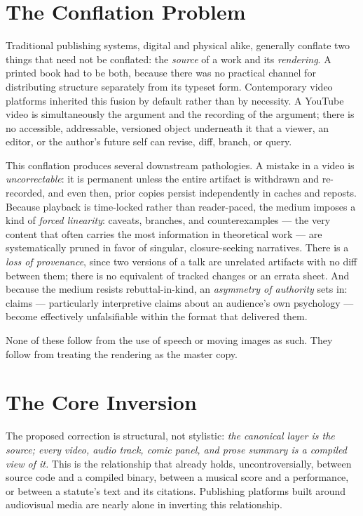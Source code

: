\documentclass[11pt]{article}
\theoremstyle{definition}
\begin{document}
\newpage

\section{The Conflation Problem}
\label{sec:conflation}

Traditional publishing systems, digital and physical alike, generally conflate two things that need not be conflated: the \emph{source} of a work and its \emph{rendering}. A printed book had to be both, because there was no practical channel for distributing structure separately from its typeset form. Contemporary video platforms inherited this fusion by default rather than by necessity. A YouTube video is simultaneously the argument and the recording of the argument; there is no accessible, addressable, versioned object underneath it that a viewer, an editor, or the author's future self can revise, diff, branch, or query.

This conflation produces several downstream pathologies. A mistake in a video is \emph{uncorrectable}: it is permanent unless the entire artifact is withdrawn and re-recorded, and even then, prior copies persist independently in caches and reposts. Because playback is time-locked rather than reader-paced, the medium imposes a kind of \emph{forced linearity}: caveats, branches, and counterexamples --- the very content that often carries the most information in theoretical work --- are systematically pruned in favor of singular, closure-seeking narratives. There is a \emph{loss of provenance}, since two versions of a talk are unrelated artifacts with no diff between them; there is no equivalent of tracked changes or an errata sheet. And because the medium resists rebuttal-in-kind, an \emph{asymmetry of authority} sets in: claims --- particularly interpretive claims about an audience's own psychology --- become effectively unfalsifiable within the format that delivered them.

None of these follow from the use of speech or moving images as such. They follow from treating the rendering as the master copy.

\section{The Core Inversion}
\label{sec:core-inversion}

The proposed correction is structural, not stylistic: \emph{the canonical layer is the source; every video, audio track, comic panel, and prose summary is a compiled view of it.} This is the relationship that already holds, uncontroversially, between source code and a compiled binary, between a musical score and a performance, or between a statute's text and its citations. Publishing platforms built around audiovisual media are nearly alone in inverting this relationship.
\end{document}
